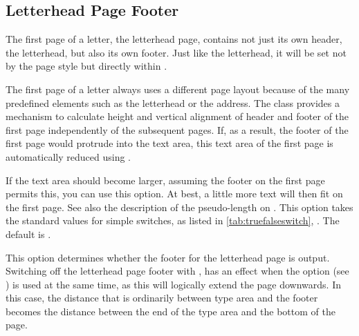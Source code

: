 \subsection{Letterhead Page Footer}
%
\BeginIndexGroup
{}%

The first page of a letter, the letterhead page, contains not just its own
header, the letterhead, but also its own footer. Just like the letterhead, it will be set not by the page
style but directly within %
.


\begin{Declaration}
\end{Declaration}
\begin{Explain}
  The first page of a letter always uses a different page layout because of
  the many predefined elements such as the letterhead or the address. The
   class provides a mechanism to calculate height and vertical
  alignment of header and footer of the first page independently of the
  subsequent pages. If, as a result, the footer of the first page would
  protrude into the text area, this text area of the first page is
  automatically reduced using
  .
\end{Explain}
If the text area should become larger, assuming the footer on the first page
permits this, you can use this option. At best, a little more text will then
fit on the first page. See also the description of the 
pseudo-length on .  This
option takes the standard values for simple switches, as listed in
\autoref{tab:truefalseswitch}, . The default
is .%
\EndIndexGroup


\begin{Declaration}
\end{Declaration}
%
This option determines whether the footer
for the letterhead page is output. Switching off the letterhead page footer
with ,
has an effect when the  option 
(see ) is used at the same
time, as this will logically extend the page downwards. In this case, the
distance that is ordinarily between type area and the footer becomes the
distance between the end of the type area and the bottom of the page.

